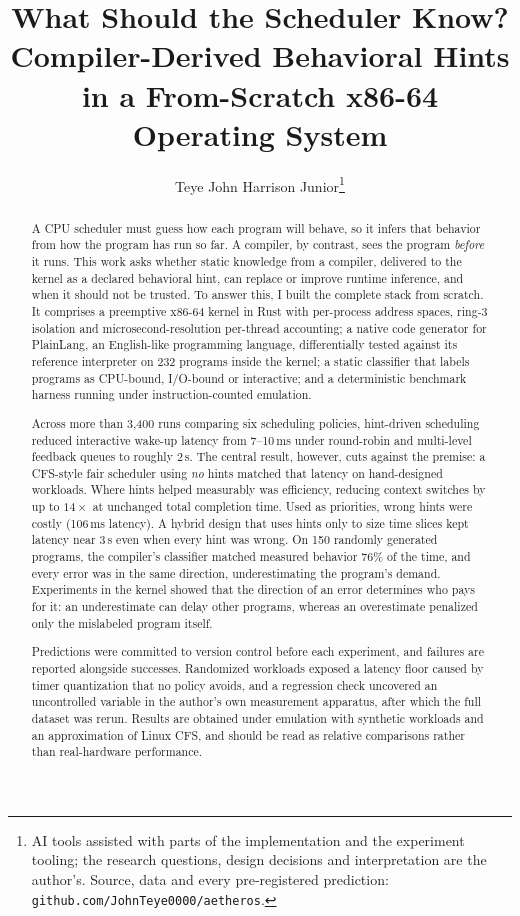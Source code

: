 \documentclass[11pt]{article}
\title{\textbf{What Should the Scheduler Know?}\\[4pt]
\large Compiler-Derived Behavioral Hints in a From-Scratch x86-64 Operating System}
\author{Teye John Harrison Junior\thanks{AI tools assisted with parts of the implementation
and the experiment tooling; the research questions, design decisions and interpretation are
the author's. Source, data and every pre-registered prediction:
\texttt{github.com/JohnTeye0000/aetheros}.}}
\date{}
\begin{document}
\maketitle

\begin{abstract}
\noindent
A CPU scheduler must guess how each program will behave, so it infers that behavior from
how the program has run so far. A compiler, by contrast, sees the program \emph{before} it runs.
This work asks whether static knowledge from a compiler, delivered to the kernel as a
declared behavioral hint, can replace or improve runtime inference, and when it should not
be trusted. To answer this, I built the complete stack from scratch. It comprises a preemptive
x86-64 kernel in Rust with per-process address spaces, ring-3 isolation and
microsecond-resolution per-thread accounting; a native code generator for PlainLang, an
English-like programming language, differentially tested against its reference interpreter
on 232 programs inside the kernel; a static classifier that labels programs as CPU-bound,
I/O-bound or interactive; and a deterministic benchmark harness running under
instruction-counted emulation.

Across more than 3{,}400 runs comparing six scheduling policies, hint-driven scheduling
reduced interactive wake-up latency from 7--10\,ms under round-robin and multi-level feedback
queues to roughly 2\,\textmu s. The central result, however, cuts against the premise: a
CFS-style fair scheduler using \emph{no} hints matched that latency on hand-designed
workloads. Where hints helped measurably was efficiency, reducing context switches by up to
$14\times$ at unchanged total completion time. Used as priorities, wrong hints were costly
(106\,ms latency). A hybrid design that uses hints only to size time slices kept latency near
3\,\textmu s even when every hint was wrong. On 150 randomly generated programs, the compiler's
classifier matched measured behavior 76\% of the time, and every error was in the same
direction, underestimating the program's demand. Experiments in the kernel showed that the
direction of an error determines who pays for it: an underestimate can delay other programs,
whereas an overestimate penalized only the mislabeled program itself.

Predictions were committed to version control before each experiment, and failures are
reported alongside successes. Randomized workloads exposed a latency floor caused by timer
quantization that no policy avoids, and a regression check uncovered an uncontrolled
variable in the author's own measurement apparatus, after which the full dataset was rerun.
Results are obtained under emulation with synthetic workloads and an approximation of Linux
CFS, and should be read as relative comparisons rather than real-hardware performance.
\end{abstract}
\end{document}
